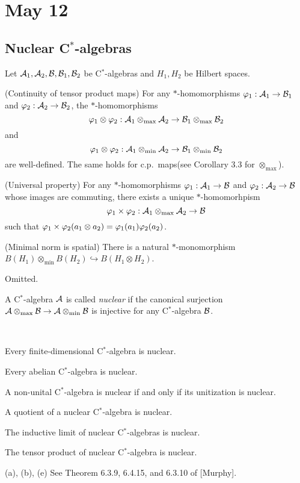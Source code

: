 \documentclass{../../../small}
\begin{document}
% 


\newpage
\section{May 12}



\subsection{Nuclear C$^*$-algebras}

\begin{prop}
Let $\mathcal{A}_1,\mathcal{A}_2,\mathcal{B},\mathcal{B}_1,\mathcal{B}_2$ be C$^*$-algebras and $H_1,H_2$ be Hilbert spaces.
\begin{parts}
\item (Continuity of tensor product maps)
For any $*$-homomorphisms $\varphi_1:\mathcal{A}_1\to\mathcal{B}_1$ and $\varphi_2:\mathcal{A}_2\to\mathcal{B}_2$, the $*$-homomorphisms
\[\varphi_1\otimes\varphi_2:\mathcal{A}_1\otimes_{\max}\mathcal{A}_2\to\mathcal{B}_1\otimes_{\max}\mathcal{B}_2\]
and
\[\varphi_1\otimes\varphi_2:\mathcal{A}_1\otimes_{\min}\mathcal{A}_2\to\mathcal{B}_1\otimes_{\min}\mathcal{B}_2\]
are well-defined.
The same holds for c.p.~maps(see Corollary 3.3 for $\otimes_{\max}$).
\item (Universal property)
For any $*$-homomorphisms $\varphi_1:\mathcal{A}_1\to\mathcal{B}$ and $\varphi_2:\mathcal{A}_2\to\mathcal{B}$ whose images are commuting, there exists a unique $*$-homomorhpism
\[\varphi_1\times\varphi_2:\mathcal{A}_1\otimes_{\max}\mathcal{A}_2\to\mathcal{B}\]
such that $\varphi_1\times\varphi_2(a_1\otimes a_2)=\varphi_1(a_1)\varphi_2(a_2)$.
\item (Minimal norm is spatial)
There is a natural $*$-monomorphism $B(H_1)\otimes_{\min}B(H_2)\hookrightarrow B(H_1\otimes H_2)$.
\end{parts}
\end{prop}
\begin{pf}
Omitted.
\end{pf}

\begin{defn}
A C$^*$-algebra $\mathcal{A}$ is called \emph{nuclear} if the canonical surjection $\mathcal{A}\otimes_{\max}\mathcal{B}\to\mathcal{A}\otimes_{\min}\mathcal{B}$ is injective for any C$^*$-algebra $\mathcal{B}$.
\end{defn}


\begin{ex}\,
\begin{parts}
\item Every finite-dimensional C$^*$-algebra is nuclear.
\item Every abelian C$^*$-algebra is nuclear.
\item A non-unital C$^*$-algebra is nuclear if and only if its unitization is nuclear.
\item A quotient of a nuclear C$^*$-algebra is nuclear.
\item The inductive limit of nuclear C$^*$-algebras is nuclear.
\item The tensor product of nuclear C$^*$-algebra is nuclear.
\end{parts}
\end{ex}
\begin{pf}
(a), (b), (e) See Theorem 6.3.9, 6.4.15, and 6.3.10 of [Murphy].
\end{pf}
\end{document}
